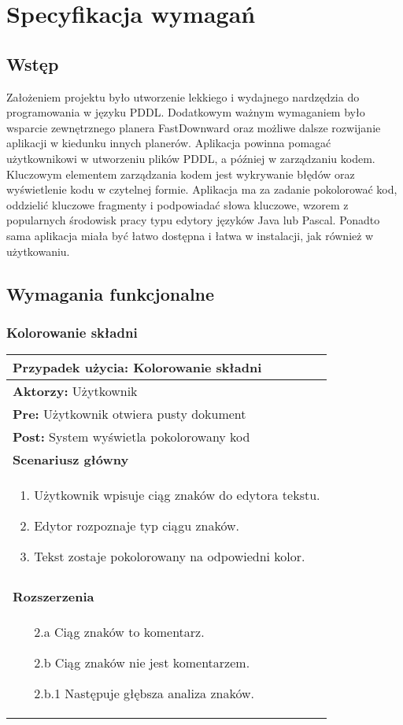 \chapter{Specyfikacja wymagań}
\label{sec:specyfikacja}
\section{Wstęp}
Założeniem projektu było utworzenie lekkiego i wydajnego nardzędzia do programowania w języku PDDL. Dodatkowym ważnym wymaganiem było wsparcie zewnętrznego planera FastDownward oraz możliwe dalsze rozwijanie aplikacji w kiedunku innych planerów. Aplikacja powinna pomagać użytkownikowi w utworzeniu plików PDDL, a później w zarządzaniu kodem. Kluczowym elementem zarządzania kodem jest wykrywanie błędów oraz wyświetlenie kodu w czytelnej formie. Aplikacja ma za zadanie pokolorować kod, oddzielić kluczowe fragmenty i podpowiadać słowa kluczowe, wzorem z popularnych środowisk pracy typu edytory języków Java lub Pascal. Ponadto sama aplikacja miała być łatwo dostępna i łatwa w instalacji, jak również w użytkowaniu.
\section{Wymagania funkcjonalne}
\subsection{Kolorowanie składni}
\begin{tabular}{|l|}
\hline 
\textbf{Przypadek użycia:} Kolorowanie składni\\
\hline
\textbf{Aktorzy:} Użytkownik\\
\hline
\textbf{Pre:} Użytkownik otwiera pusty dokument\\
\hline
\textbf{Post:} System wyświetla pokolorowany kod\\
\hline
\textbf{Scenariusz główny}\\
\hline
\begin{enumerate}
\item Użytkownik wpisuje ciąg znaków do edytora tekstu.
\item Edytor rozpoznaje typ ciągu znaków.
\item Tekst zostaje pokolorowany na odpowiedni kolor.
\end{enumerate}\\
\hline
\\\textbf{Rozszerzenia}\\
\hline
\begin{enumerate}
\item[2.a] Ciąg znaków to komentarz.
\item[2.b] Ciąg znaków nie jest komentarzem.
\item[2.b.1] Następuje głębsza analiza znaków.
\end{enumerate}\\
\hline
\end{tabular} 

